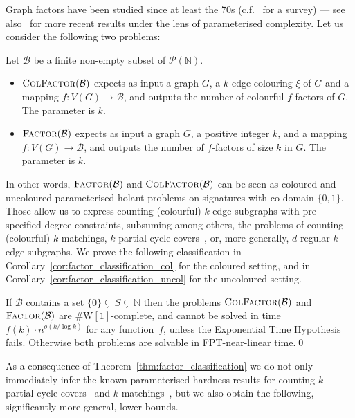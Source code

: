 \documentclass[authorcolumns,numberwithinsect]{no-lipics-v2022}
\newcommand{\W}{\mathrm{W}}
\begin{document}
Graph factors have been studied since at least the 70s (c.f.\ \cite{Plummer07} for a survey) --- see also~\cite{MarxSS21,MarxSS22} for more recent results under the lens of parameterised complexity. Let us consider the following two problems:
\begin{definition}
    Let $\mathcal{B}$ be a finite non-empty subset of $\mathcal{P}(\mathbb{N})$. 
    \begin{itemize}
    \item $\textsc{ColFactor}(\mathcal{B})$ expects as input a graph $G$, a $k$-edge-colouring $\xi$ of $G$ and a mapping $f:V(G) \to \mathcal{B}$, and outputs the number of colourful $f$-factors of $G$. The parameter is $k$.
    \item $\textsc{Factor}(\mathcal{B})$ expects as input a graph $G$, a positive integer $k$, and a mapping $f:V(G) \to \mathcal{B}$, and outputs the number of $f$-factors of size $k$ in $G$. The parameter is $k$.
\end{itemize}
\end{definition}

In other words, $\textsc{Factor}(\mathcal{B})$ and $\textsc{ColFactor}(\mathcal{B})$ can be seen as coloured and uncoloured parameterised holant problems on signatures with co-domain $\{0,1\}$. Those allow us to express counting (colourful) $k$-edge-subgraphs with pre-specified degree constraints, subsuming among others, the problems of counting (colourful) $k$-matchings, $k$-partial cycle covers~\cite{BlaserC12}, or, more generally, $d$-regular $k$-edge subgraphs. We prove the following classification in Corollary~\ref{cor:factor_classification_col} for the coloured setting, and in Corollary~\ref{cor:factor_classification_uncol} for the uncoloured setting. 

\begin{theorem}\label{thm:factor_classification}
    If $\mathcal{B}$ contains a set $\{0\} \subsetneq S \subsetneq \mathbb{N}$ then the problems $\textsc{ColFactor}(\mathcal{B})$ and $\textsc{Factor}(\mathcal{B})$ are $\#\W[1]$-complete, and cannot be solved in time $f(k)\cdot n^{o(k/\log k)}$ for any function~$f$, unless the Exponential Time Hypothesis fails. Otherwise both problems are solvable in FPT-near-linear time.\qed
\end{theorem}


As a consequence of Theorem~\ref{thm:factor_classification} we do not only immediately infer the known parameterised hardness results for counting $k$-partial cycle covers~\cite{BlaserC12} and $k$-matchings~\cite{Curticapean13}, but we also obtain the following, significantly more general, lower bounds.
\end{document}
